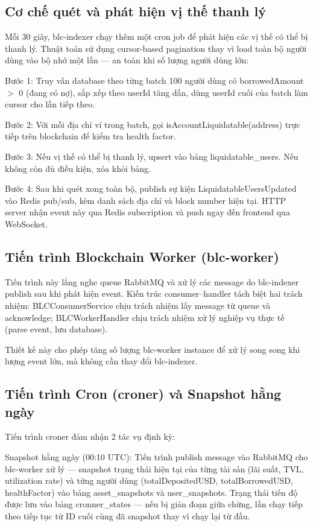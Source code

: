 \documentclass[../DoAn.tex]{subfiles}
\begin{document}
\subsection{Cơ chế quét và phát hiện vị thế thanh lý}


Mỗi 30 giây, blc-indexer chạy thêm một cron job để phát hiện các vị thế có thể bị thanh lý. Thuật toán sử dụng cursor-based pagination thay vì load toàn bộ người dùng vào bộ nhớ một lần --- an toàn khi số lượng người dùng lớn:

Bước 1: Truy vấn database theo từng batch 100 người dùng có borrowedAmount $>$ 0 (đang có nợ), sắp xếp theo userId tăng dần, dùng userId cuối của batch làm cursor cho lần tiếp theo.

Bước 2: Với mỗi địa chỉ ví trong batch, gọi isAccountLiquidatable(address) trực tiếp trên blockchain để kiểm tra health factor.

Bước 3: Nếu vị thế có thể bị thanh lý, upsert vào bảng liquidatable\_users. Nếu không còn đủ điều kiện, xóa khỏi bảng.

Bước 4: Sau khi quét xong toàn bộ, publish sự kiện LiquidatableUsersUpdated vào Redis pub/sub, kèm danh sách địa chỉ và block number hiện tại. HTTP server nhận event này qua Redis subscription và push ngay đến frontend qua WebSocket.

\subsection{Tiến trình Blockchain Worker (blc-worker)}


Tiến trình này lắng nghe queue RabbitMQ và xử lý các message do blc-indexer publish sau khi phát hiện event. Kiến trúc consumer–handler tách biệt hai trách nhiệm: BLCConsumerService chịu trách nhiệm lấy message từ queue và acknowledge; BLCWorkerHandler chịu trách nhiệm xử lý nghiệp vụ thực tế (parse event, lưu database).

Thiết kế này cho phép tăng số lượng blc-worker instance để xử lý song song khi lượng event lớn, mà không cần thay đổi blc-indexer.

\subsection{Tiến trình Cron (croner) và Snapshot hằng ngày}


Tiến trình croner đảm nhận 2 tác vụ định kỳ:

Snapshot hằng ngày (00:10 UTC): Tiến trình publish message vào RabbitMQ cho blc-worker xử lý --- snapshot trạng thái hiện tại của từng tài sản (lãi suất, TVL, utilization rate) và từng người dùng (totalDepositedUSD, totalBorrowedUSD, healthFactor) vào bảng asset\_snapshots và user\_snapshots. Trạng thái tiến độ được lưu vào bảng cronner\_states --- nếu bị gián đoạn giữa chừng, lần chạy tiếp theo tiếp tục từ ID cuối cùng đã snapshot thay vì chạy lại từ đầu.
\end{document}
